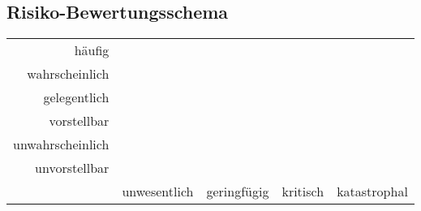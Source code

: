 \subsection{Risiko-Bewertungsschema}
\begin{table}[h!]
	\renewcommand{\arraystretch}{1.5}
	\centering
	\begin{tabular}{r || c c c c}
		häufig 		
			& \cellcolor{red} 
			& \cellcolor{red}
			& \cellcolor{red}
			& \cellcolor{red} \\
		wahrscheinlich		
			& \cellcolor{yellow} 
			& \cellcolor{yellow} 
			& \cellcolor{red}
			& \cellcolor{red} \\
		gelegentlich		
			& \cellcolor{yellow}
			& \cellcolor{yellow}
			& \cellcolor{yellow}
			& \cellcolor{red} \\
		vorstellbar		
			& \cellcolor{green}
			& \cellcolor{yellow}
			& \cellcolor{yellow}
			& \cellcolor{yellow} \\
		unwahrscheinlich	
			& \cellcolor{green}
			& \cellcolor{green}
			& \cellcolor{yellow}
			& \cellcolor{yellow} \\
		unvorstellbar		
			& \cellcolor{green}
			& \cellcolor{green}
			& \cellcolor{green}
			& \cellcolor{green} \\
		\hline
		& unwesentlich & geringfügig & kritisch & katastrophal
	\end{tabular}
\end{table}
